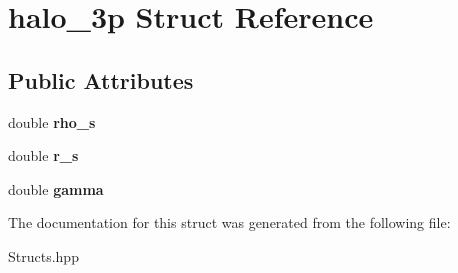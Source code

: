 \hypertarget{structhalo__3p}{}\section{halo\+\_\+3p Struct Reference}
\label{structhalo__3p}
\subsection*{Public Attributes}
\begin{DoxyCompactItemize}
\item 
\mbox{\label{structhalo__3p_a9423e706c526a63b249c9b5059ee8be4}} 
double {\bfseries rho\+\_\+s}
\item 
\mbox{\label{structhalo__3p_a3a546f100719cca22e75271c01eece78}} 
double {\bfseries r\+\_\+s}
\item 
\mbox{\label{structhalo__3p_a53b227983af0843c72d8c56aa50be08f}} 
double {\bfseries gamma}
\end{DoxyCompactItemize}


The documentation for this struct was generated from the following file\+:\begin{DoxyCompactItemize}
\item 
Structs.\+hpp\end{DoxyCompactItemize}
